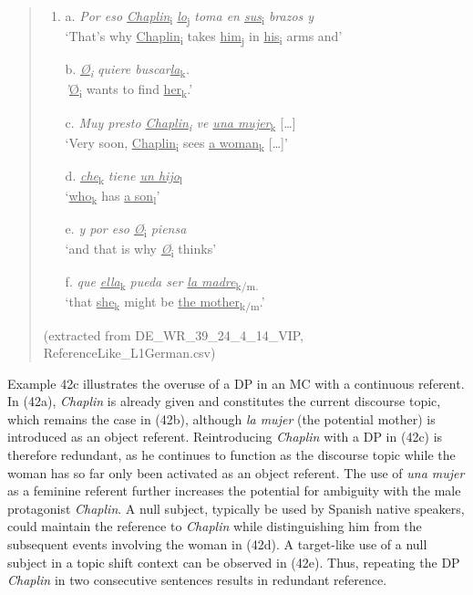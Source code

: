 \documentclass[
  letterpaper,
  DIV=11,
  numbers=noendperiod]{scrartcl}
\begin{document}
\begin{quote}
\begin{enumerate}
\def\labelenumi{\arabic{enumi}.}
\setcounter{enumi}{41}
\item
  a. \emph{Por eso \ul{Chaplin}}\textsubscript{i}
  \ul{\emph{lo}}\textsubscript{j} \emph{toma en
  \ul{sus}}\textsubscript{i} \emph{brazos y}\\
  `That's why \ul{Chaplin}\textsubscript{i} takes
  \ul{him}\textsubscript{j} in \ul{his}\textsubscript{i} arms and'

  b. \ul{\emph{Ø}}\textsubscript{\emph{i}} \emph{quiere
  buscar\ul{la}}\textsubscript{k}\emph{.\\
  '}\ul{Ø}\textsubscript{i} wants to find \ul{her}\textsubscript{k}.'

  c. \emph{Muy presto \ul{Chaplin}\textsubscript{i} ve \ul{una
  mujer}}\textsubscript{k} {[}\ldots{]}\\
  `Very soon, \ul{Chaplin}\textsubscript{i} sees \ul{a
  woman}\textsubscript{k} {[}\ldots{]}'

  d. \ul{\emph{che}}\textsubscript{k} \emph{tiene \ul{un
  hijo}}\textsubscript{l}\\
  `\ul{who}\textsubscript{k} has \ul{a son}\textsubscript{l}'

  e. \emph{y por eso \ul{Ø}}\textsubscript{i} \emph{piensa}\\
  `and that is why \ul{\emph{Ø}}\textsubscript{i} thinks'

  f. \emph{que \ul{ella}}\textsubscript{k} \emph{pueda ser \ul{la
  madre}}\textsubscript{k/m.}\\
  `that \ul{she}\textsubscript{k} might be \ul{the
  mother}\textsubscript{k/m}.'
\end{enumerate}

(extracted from DE\_WR\_39\_24\_4\_14\_VIP, ReferenceLike\_L1German.csv)
\end{quote}

Example 42c illustrates the overuse of a DP in an MC with a continuous
referent. In (42a), \emph{Chaplin} is already given and constitutes the
current discourse topic, which remains the case in (42b), although
\emph{la mujer} (the potential mother) is introduced as an object
referent. Reintroducing \emph{Chaplin} with a DP in (42c) is therefore
redundant, as he continues to function as the discourse topic while the
woman has so far only been activated as an object referent. The use of
\emph{una mujer} as a feminine referent further increases the potential
for ambiguity with the male protagonist \emph{Chaplin}. A null subject,
typically be used by Spanish native speakers, could maintain the
reference to \emph{Chaplin} while distinguishing him from the subsequent
events involving the woman in (42d). A target-like use of a null subject
in a topic shift context can be observed in (42e). Thus, repeating the
DP \emph{Chaplin} in two consecutive sentences results in redundant
reference.
\end{document}
